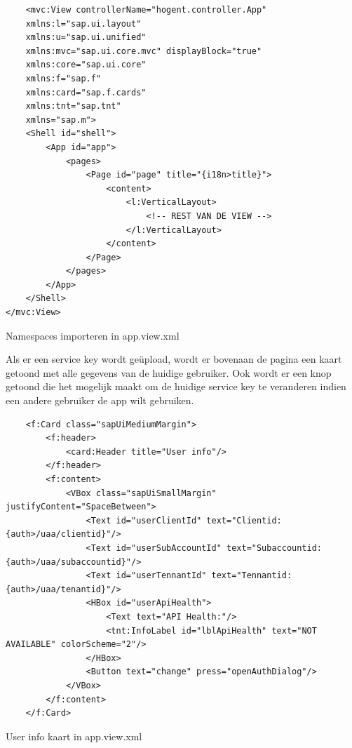 \begin{listing}[H]
\begin{verbatim}
    <mvc:View controllerName="hogent.controller.App"
    xmlns:l="sap.ui.layout"
    xmlns:u="sap.ui.unified"
    xmlns:mvc="sap.ui.core.mvc" displayBlock="true"
    xmlns:core="sap.ui.core"
    xmlns:f="sap.f"
    xmlns:card="sap.f.cards"
    xmlns:tnt="sap.tnt"
    xmlns="sap.m">
    <Shell id="shell">
        <App id="app">
            <pages>
                <Page id="page" title="{i18n>title}">
                    <content>
                        <l:VerticalLayout>
                            <!-- REST VAN DE VIEW -->
                        </l:VerticalLayout>
                    </content>
                </Page>
            </pages>
        </App>
    </Shell>
</mvc:View>
\end{verbatim}
\caption{Namespaces importeren in app.view.xml}
\label{code:app-view}
\end{listing}

Als er een service key wordt geüpload, wordt er bovenaan de pagina een kaart getoond met alle gegevens van de huidige gebruiker. Ook wordt er een knop getoond die het mogelijk maakt om de huidige service key te veranderen indien een andere gebruiker de app wilt gebruiken. 
\begin{listing}[H]
\begin{verbatim}
    <f:Card class="sapUiMediumMargin">
        <f:header>
            <card:Header title="User info"/>
        </f:header>
        <f:content>
            <VBox class="sapUiSmallMargin" justifyContent="SpaceBetween">
                <Text id="userClientId" text="Clientid: {auth>/uaa/clientid}"/>
                <Text id="userSubAccountId" text="Subaccountid: {auth>/uaa/subaccountid}"/>
                <Text id="userTennantId" text="Tennantid: {auth>/uaa/tenantid}"/>
                <HBox id="userApiHealth">
                    <Text text="API Health:"/>
                    <tnt:InfoLabel id="lblApiHealth" text="NOT AVAILABLE" colorScheme="2"/>
                </HBox>
                <Button text="change" press="openAuthDialog"/>
            </VBox>
        </f:content>
    </f:Card>
\end{verbatim}
\caption{User info kaart in app.view.xml}
\end{listing}


